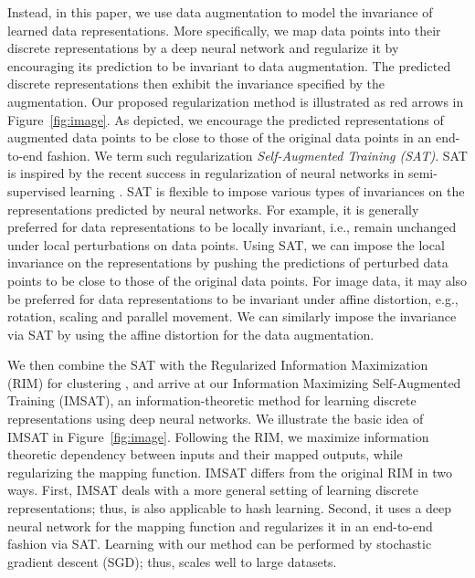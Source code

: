 \documentclass{article}
\theoremstyle{plain}
\begin{document}
Instead, in this paper, we use data augmentation to model the invariance of learned data representations.
More specifically, we map data points into their discrete representations by a deep neural network and regularize it by encouraging its prediction to be invariant to data augmentation.
The predicted discrete representations then exhibit the invariance specified by the augmentation.
Our proposed regularization method is illustrated as red arrows in Figure~\ref{fig:image}.
As depicted, we encourage the predicted representations of augmented data points to be close to those of the original data points in an end-to-end fashion. 
We term such regularization \emph{Self-Augmented Training (SAT)}.
SAT is inspired by the recent success in regularization of neural networks in semi-supervised learning \citep{bachman2014learning, miyato2015distributional, sajjadi2016regularization}.
SAT is flexible to impose various types of invariances on the representations predicted by neural networks.
For example, it is generally preferred for data representations to be locally invariant, i.e., remain unchanged under local perturbations on data points.
Using SAT, we can impose the local invariance on the representations by pushing the predictions of perturbed data points to be close to those of the original data points. 
For image data, it may also be preferred for data representations to be invariant under affine distortion, e.g., rotation, scaling and parallel movement.
We can similarly impose the invariance via SAT by using the affine distortion for the data augmentation.


We then combine the SAT with the Regularized Information Maximization (RIM) for clustering \citep{krause2010discriminative, heading1991unsupervised}, and arrive at our Information Maximizing Self-Augmented Training (IMSAT), an information-theoretic method for learning discrete representations using deep neural networks. 
We illustrate the basic idea of IMSAT in Figure~\ref{fig:image}. 
Following the RIM, we maximize information theoretic dependency between inputs and their mapped outputs, while regularizing the mapping function.
IMSAT differs from the original RIM in two ways.
First, IMSAT deals with a more general setting of learning discrete representations; thus, is also applicable to hash learning.
Second, it uses a deep neural network for the mapping function and regularizes it in an end-to-end fashion via SAT.
Learning with our method can be performed by stochastic gradient descent (SGD); thus, scales well to large datasets.
\end{document}
